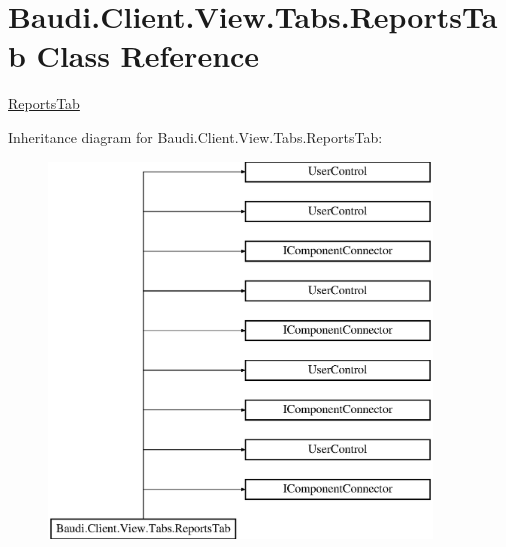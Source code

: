 \hypertarget{class_baudi_1_1_client_1_1_view_1_1_tabs_1_1_reports_tab}{}\section{Baudi.\+Client.\+View.\+Tabs.\+Reports\+Tab Class Reference}
\label{class_baudi_1_1_client_1_1_view_1_1_tabs_1_1_reports_tab}


\hyperlink{class_baudi_1_1_client_1_1_view_1_1_tabs_1_1_reports_tab}{Reports\+Tab}  


Inheritance diagram for Baudi.\+Client.\+View.\+Tabs.\+Reports\+Tab\+:\begin{figure}[H]
\begin{center}
\leavevmode
\includegraphics[height=10.000000cm]{class_baudi_1_1_client_1_1_view_1_1_tabs_1_1_reports_tab}
\end{center}
\end{figure}
